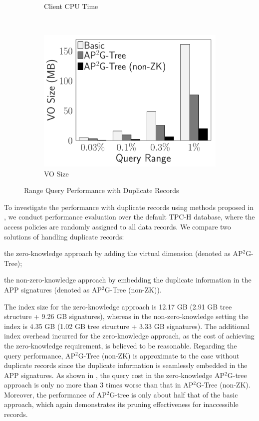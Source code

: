\begin{figure}[t]
\begin{subfigure}{.33\linewidth}
        \caption{Client CPU Time}
    \end{subfigure}~%
    \begin{subfigure}{.33\linewidth}
        \includegraphics[width=\linewidth]{exp-figs/access-control/dup_vo.pdf}
        \caption{VO Size}
    \end{subfigure}
    \caption{Range Query Performance with Duplicate Records}\label{exp-fig:access-control:dup}
\end{figure}

To investigate the performance with duplicate records using methods proposed in , we conduct performance evaluation over the default TPC-H database, where the access policies are randomly assigned to all data records.
We compare two solutions of handling duplicate records:
\begin{inlineenum}
    \item the zero-knowledge approach by adding the virtual dimension (denoted as AP$^2$G-Tree);
    \item the non-zero-knowledge approach by embedding the duplicate information in the APP signatures (denoted as AP$^2$G-Tree (non-ZK)).
\end{inlineenum}
The index size for the zero-knowledge approach is 12.17 GB (2.91 GB tree structure + 9.26 GB signatures), whereas in the non-zero-knowledge setting the index is 4.35 GB (1.02 GB tree structure + 3.33 GB signatures). The additional index overhead incurred for the zero-knowledge approach, as the cost of achieving the zero-knowledge requirement, is believed to be reasonable. Regarding the query performance, AP$^2$G-Tree (non-ZK) is approximate to the case without duplicate records since the duplicate information is seamlessly embedded in the APP signatures. As shown in , the query cost in the zero-knowledge AP$^2$G-tree approach is only no more than 3 times worse than that in AP$^2$G-Tree (non-ZK). Moreover, the performance of AP$^2$G-tree is only about half that of the basic approach, which again demonstrates its pruning effectiveness for inaccessible records.

